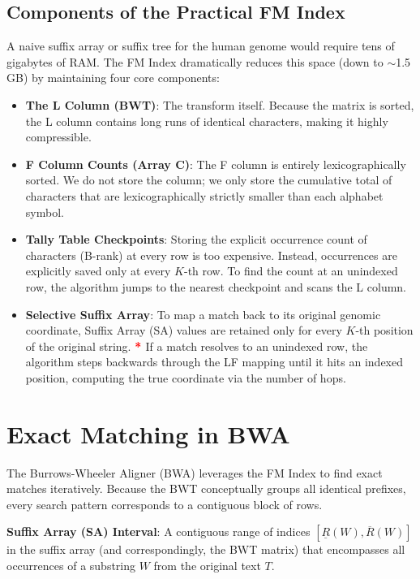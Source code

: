 \documentclass{article}
\newcommand{\sta}{\textbf{\textcolor{red}{* }}}
\begin{document}
\subsection{Components of the Practical FM Index}
A naive suffix array or suffix tree for the human genome would require tens of gigabytes of RAM. The FM Index dramatically reduces this space (down to $\sim$1.5 GB) by maintaining four core components:
\begin{itemize}
    \item \textbf{The L Column (BWT)}: The transform itself. Because the matrix is sorted, the L column contains long runs of identical characters, making it highly compressible.
    \item \textbf{F Column Counts (Array C)}: The F column is entirely lexicographically sorted. We do not store the column; we only store the cumulative total of characters that are lexicographically strictly smaller than each alphabet symbol.
    \item \textbf{Tally Table Checkpoints}: Storing the explicit occurrence count of characters (B-rank) at every row is too expensive. Instead, occurrences are explicitly saved only at every $K$-th row. To find the count at an unindexed row, the algorithm jumps to the nearest checkpoint and scans the L column. 
    \item \textbf{Selective Suffix Array}: To map a match back to its original genomic coordinate, Suffix Array (SA) values are retained only for every $K$-th position of the original string. \sta If a match resolves to an unindexed row, the algorithm steps backwards through the LF mapping until it hits an indexed position, computing the true coordinate via the number of hops.
\end{itemize}

\section{Exact Matching in BWA}
The Burrows-Wheeler Aligner (BWA) leverages the FM Index to find exact matches iteratively. Because the BWT conceptually groups all identical prefixes, every search pattern corresponds to a contiguous block of rows.

\begin{important}
    \textbf{Suffix Array (SA) Interval}: A contiguous range of indices $[\underline{R}(W), \overline{R}(W)]$ in the suffix array (and correspondingly, the BWT matrix) that encompasses all occurrences of a substring $W$ from the original text $T$.
\end{important}
\end{document}
